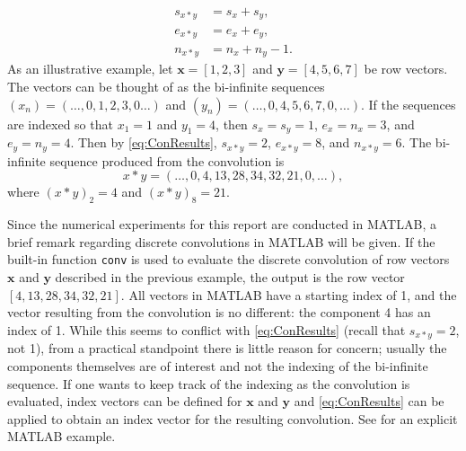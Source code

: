 \documentclass[12pt]{article}
\begin{document}
\begin{align}
s_{x*y} &= s_x + s_y, \nonumber \\
e_{x*y} &= e_x + e_y, \label{eq:ConResults} \\
n_{x*y} &= n_x + n_y - 1. \nonumber
\end{align}
As an illustrative example, let $\mathbf{x} = [1,2,3]$ and $\mathbf{y} = [4,5,6,7]$ be row vectors. The vectors can be thought of as the bi-infinite sequences $(x_n) = (\ldots,0,1,2,3,0\ldots)$ and $(y_n) = (\ldots,0,4,5,6,7,0,\ldots)$. If the sequences are indexed so that $x_1 = 1$ and $y_1 = 4$, then $s_x = s_y = 1$, $e_x = n_x = 3$, and $e_y = n_y = 4$. Then by \eqref{eq:ConResults}, $s_{x*y} = 2$, $e_{x*y} = 8$, and $n_{x*y} = 6$. The bi-infinite sequence produced from the convolution is
\[x*y = (\ldots,0,4,13,28,34,32,21,0,\ldots),\]
where $(x*y)_2 = 4$ and $(x*y)_8 = 21$. \par 
Since the numerical experiments for this report are conducted in MATLAB, a brief remark regarding discrete convolutions in MATLAB will be given. If the built-in function \texttt{conv} is used to evaluate the discrete convolution of row vectors $\mathbf{x}$ and $\mathbf{y}$ described in the previous example, the output is the row vector $[4,13,28,34,32,21]$.  All vectors in MATLAB have a starting index of 1, and the vector resulting from the convolution is no different: the component 4 has an index of 1. While this seems to conflict with \eqref{eq:ConResults} (recall that $s_{x*y} = 2$, not 1), from a practical standpoint there is little reason for concern; usually the components themselves are of interest and not the indexing of the bi-infinite sequence. If one wants to keep track of the indexing as the convolution is evaluated, index vectors can be defined for $\mathbf{x}$ and $\mathbf{y}$ and \eqref{eq:ConResults} can be applied to obtain an index vector for the resulting convolution. See \cite{BoggessAlbert2001Afci} for an explicit MATLAB example. \par 
\end{document}
